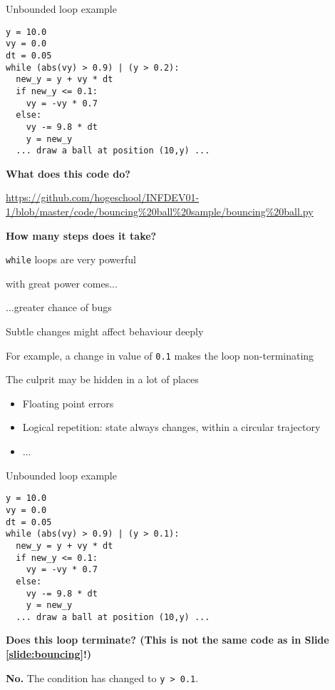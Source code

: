 \documentclass{beamer}
\begin{document}
\begin{frame}[fragile]{Unbounded loop example}
\label{slide:bouncing}

\begin{lstlisting}[basicstyle=\ttfamily\tiny]
y = 10.0
vy = 0.0
dt = 0.05
while (abs(vy) > 0.9) | (y > 0.2):
  new_y = y + vy * dt
  if new_y <= 0.1:
    vy = -vy * 0.7
  else:
    vy -= 9.8 * dt
    y = new_y
  ... draw a ball at position (10,y) ...
\end{lstlisting}

\textbf{What does this code do?}

\url{https://github.com/hogeschool/INFDEV01-1/blob/master/code/bouncing%20ball%20sample/bouncing%20ball.py}

\textbf{How many steps does it take?}
\end{frame}

\begin{slide}{
\item \texttt{while} loops are very powerful
\item with great power comes...
\pause
\item ...greater chance of bugs
}\end{slide}

\begin{slide}{
\item Subtle changes might affect behaviour deeply
\item For example, a change in value of \texttt{0.1} makes the loop non-terminating
\item The culprit may be hidden in a lot of places
\begin{itemize}
\item Floating point errors
\item Logical repetition: state always changes, within a circular trajectory
\item ...
\end{itemize}
}\end{slide}

\begin{frame}[fragile]{Unbounded loop example}
\begin{lstlisting}[basicstyle=\ttfamily\tiny]
y = 10.0
vy = 0.0
dt = 0.05
while (abs(vy) > 0.9) | (y > 0.1):
  new_y = y + vy * dt
  if new_y <= 0.1:
    vy = -vy * 0.7
  else:
    vy -= 9.8 * dt
    y = new_y
  ... draw a ball at position (10,y) ...
\end{lstlisting}

\textbf{Does this loop terminate? (This is not the same code as in Slide \ref{slide:bouncing}!)}

\pause

\textbf{No.} The condition has changed to \texttt{y > 0.1}.
\end{frame}
\end{document}

